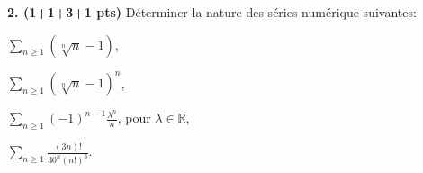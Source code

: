\documentclass[a4paper,10pt]{article}
\newcommand{\R}{\mathbb{R}}
\begin{document}
\vspace{.1in}


\noindent
\textbf{2. (1+1+3+1 pts)}
Déterminer la nature des séries numérique suivantes:
\begin{enumerate}[label=\alph*)]
\begin{minipage}{0.4\linewidth}
    \item $\sum_{n\geq1}(\sqrt[n]{n}-1)$,
    \item $\sum_{n\geq1}(\sqrt[n]{n}-1)^n$,
\end{minipage}
\begin{minipage}{0.4\linewidth}
    \item $\sum_{n\geq1}(-1)^{n-1}\frac{\lambda^n}{n}$, pour $\lambda\in\R$,
    \item $\sum_{n\geq1}\frac{(3n)!}{30^n(n!)^3}$.
\end{minipage}
\end{enumerate}
\end{document}
